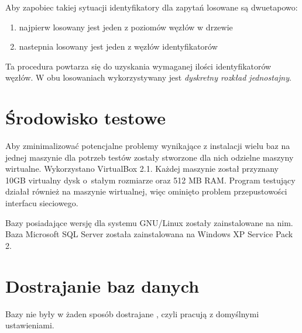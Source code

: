Aby zapobiec takiej sytuacji identyfikatory dla zapytań losowane są dwuetapowo:
\begin{enumerate}
 \item najpierw losowany jest jeden z poziomów węzłów w drzewie
 \item nastepnia losowany jest jeden z węzłów identyfikatorów
\end{enumerate}
Ta procedura powtarza się do uzyskania wymaganej ilości identyfikatorów węzłów. 
W obu losowaniach wykorzystywany jest \emph{dyskretny rozkład jednostajny}. 








\section{Środowisko testowe}

Aby zminimalizować potencjalne problemy wynikające z instalacji wielu baz na 
jednej maszynie dla potrzeb testów zostały stworzone dla nich odzielne maszyny wirtualne. 
Wykorzystano VirtualBox 2.1. Każdej maszynie został przyznany 10GB virtualny dysk 
o~stałym rozmiarze oraz 512 MB RAM. Program testujący działał również na maszynie wirtualnej, 
więc ominięto problem przepustowości interfacu sieciowego. 

Bazy posiadające wersję dla systemu GNU/Linux zostały zainstalowane na nim. 
Baza Microsoft SQL Server została zainstalowana na Windows XP Service Pack 2.

\section{Dostrajanie baz danych}

Bazy nie były w żaden sposób dostrajane , czyli pracują z domyślnymi ustawieniami. 


